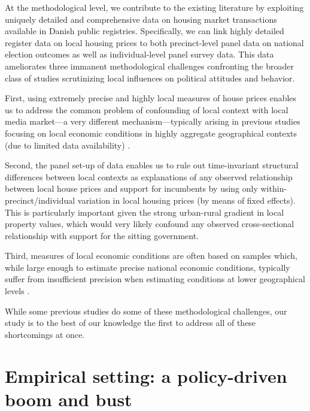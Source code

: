 \documentclass[12pt,a4paper]{article}
\begin{document}
At the methodological level, we contribute to the existing literature by exploiting uniquely detailed and comprehensive data on housing market transactions available in Danish public registries. Specifically, we can link highly detailed register data on local housing prices to both precinct-level panel data on national election outcomes as well as individual-level panel survey data. This data ameliorates three immanent methodological challenges confronting the broader class of studies scrutinizing local influences on political attitudes and behavior.

First, using extremely precise and highly local measures of house prices enables us to address the common problem of confounding of local context with local media market—a very different mechanism—typically arising in previous studies focusing on local economic conditions in highly aggregate geographical contexts (due to limited data availability) \citep[][]{bisgaard2016reconsidering}.  

Second, the panel set-up of data enables us to rule out time-invariant structural differences between local contexts as explanations of any observed relationship between local house prices and support for incumbents by using only within-precinct/individual variation in local housing prices (by means of fixed effects). This is particularly important given the strong urban-rural gradient in local property values, which would very likely confound any observed cross-sectional relationship with support for the sitting government. 

Third,  measures of local economic conditions are often based on samples which, while large enough to estimate precise national economic conditions, typically suffer from insufficient precision when estimating conditions at lower geographical levels \citep[][]{healy2014presidential}. 


While some previous studies do  some of these methodological challenges, our study is to the best of our knowledge the first to address all of these shortcomings at once. 



\section{Empirical setting: a policy-driven boom and bust}
\end{document}
